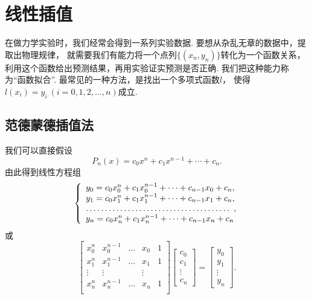 \section{线性插值}
在做力学实验时，我们经常会得到一系列实验数据.
要想从杂乱无章的数据中，提取出物理规律，
就需要我们有能力将一个点列\(\{(x_n,y_n)\}\)转化为一个函数关系，
利用这个函数给出预测结果，再用实验证实预测是否正确.
我们把这种能力称为“函数拟合”.
最常见的一种方法，是找出一个多项式函数\(l\)，
使得\(l(x_i) = y_i\ (i=0,1,2,\dotsc,n)\)成立.

\subsection{范德蒙德插值法}
我们可以直接假设\begin{equation*}
	P_n(x) = c_0 x^n + c_1 x^{n-1} + \dotsb + c_n.
\end{equation*}
由此得到线性方程组\begin{equation*}
	\left\{ \begin{array}{l}
		y_0 = c_0 x_0^n + c_1 x_0^{n-1} + \dotsb + c_{n-1} x_0 + c_n, \\
		y_1 = c_0 x_1^n + c_1 x_1^{n-1} + \dotsb + c_{n-1} x_1 + c_n, \\
		\hdotsfor{1}, \\
		y_n = c_0 x_n^n + c_1 x_n^{n-1} + \dotsb + c_{n-1} x_n + c_n
	\end{array} \right.
\end{equation*}
或\begin{equation*}
	\begin{bmatrix}
		x_0^n & x_0^{n-1} & \dots & x_0 & 1 \\
		x_1^n & x_1^{n-1} & \dots & x_1 & 1 \\
		\vdots & \vdots && \vdots \\
		x_n^n & x_n^{n-1} & \dots & x_n & 1 \\
	\end{bmatrix}
	\begin{bmatrix}
		c_0 \\ c_1 \\ \vdots \\ c_n
	\end{bmatrix}
	= \begin{bmatrix}
		y_0 \\ y_1 \\ \vdots \\ y_n
	\end{bmatrix}.
\end{equation*}

